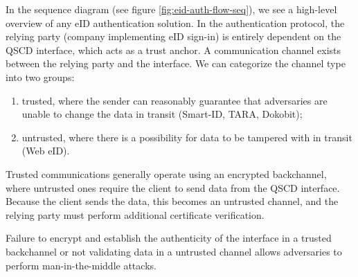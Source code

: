 In the sequence diagram (see figure \ref{fig:eid-auth-flow-seq}), we see a high-level overview of any eID authentication solution. In the authentication protocol, the relying party (company implementing eID sign-in) is entirely dependent on the QSCD interface, which acts as a trust anchor. A communication channel exists between the relying party and the interface. We can categorize the channel type into two groups:

\begin{enumerate}
    \item trusted, where the sender can reasonably guarantee that adversaries are unable to change the data in transit (Smart-ID, TARA, Dokobit);
    \item untrusted, where there is a possibility for data to be tampered with in transit (Web eID).
\end{enumerate}

Trusted communications generally operate using an encrypted backchannel, where untrusted ones require the client to send data from the QSCD interface. Because the client sends the data, this becomes an untrusted channel, and the relying party must perform additional certificate verification.

Failure to encrypt and establish the authenticity of the interface in a trusted backchannel or not validating data in a untrusted channel allows adversaries to perform man-in-the-middle attacks.



